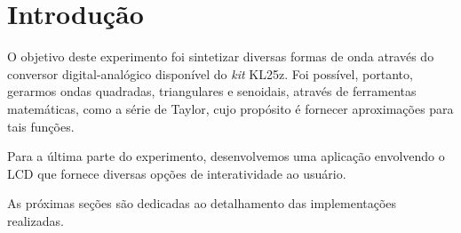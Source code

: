 \section {Introdução}

O objetivo deste experimento foi sintetizar diversas formas de onda através do
conversor digital-analógico disponível do \textit{kit} KL25z. Foi possível,
portanto, gerarmos ondas quadradas, triangulares e senoidais, através de ferramentas
matemáticas, como a série de Taylor, cujo propósito é fornecer aproximações para
tais funções.

\vspace{12pt}

Para a última parte do experimento, desenvolvemos uma aplicação envolvendo o LCD
que fornece diversas opções de interatividade ao usuário.

\vspace{12pt}

As próximas seções são dedicadas ao detalhamento das implementações realizadas.
